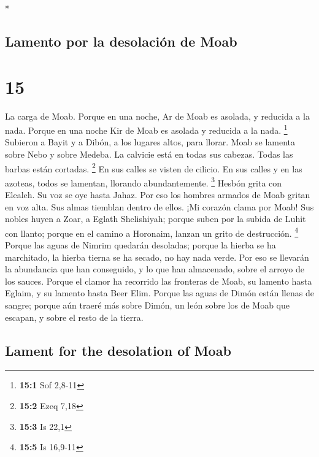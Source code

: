 \begin{paracol}{2}
\begin{otherlanguage}{english}
\end{otherlanguage}

\switchcolumn[0]*

\hypertarget{lamento-por-la-desolaciuxf3n-de-moab}{%
\subsection{Lamento por la desolación de
Moab}\label{lamento-por-la-desolaciuxf3n-de-moab}}

\hypertarget{section-28}{%
\section{15}\label{section-28}}

 La carga de Moab. Porque en una noche, Ar de Moab es
asolada, y reducida a la nada. Porque en una noche Kir de Moab es
asolada y reducida a la nada. \footnote{\textbf{15:1} Sof 2,8-11}
 Subieron a Bayit y a Dibón, a los lugares altos, para
llorar. Moab se lamenta sobre Nebo y sobre Medeba. La calvicie está en
todas sus cabezas. Todas las barbas están cortadas. \footnote{\textbf{15:2}
  Ezeq 7,18}  En sus calles se visten de cilicio. En sus
calles y en las azoteas, todos se lamentan, llorando abundantemente.
\footnote{\textbf{15:3} Is 22,1}  Hesbón grita con
Elealeh. Su voz se oye hasta Jahaz. Por eso los hombres armados de Moab
gritan en voz alta. Sus almas tiemblan dentro de ellos. 
¡Mi corazón clama por Moab! Sus nobles huyen a Zoar, a Eglath
Shelishiyah; porque suben por la subida de Luhit con llanto; porque en
el camino a Horonaim, lanzan un grito de destrucción. \footnote{\textbf{15:5}
  Is 16,9-11}  Porque las aguas de Nimrim quedarán
desoladas; porque la hierba se ha marchitado, la hierba tierna se ha
secado, no hay nada verde.  Por eso se llevarán la
abundancia que han conseguido, y lo que han almacenado, sobre el arroyo
de los sauces.  Porque el clamor ha recorrido las
fronteras de Moab, su lamento hasta Eglaim, y su lamento hasta Beer
Elim.  Porque las aguas de Dimón están llenas de sangre;
porque aún traeré más sobre Dimón, un león sobre los de Moab que
escapan, y sobre el resto de la tierra.

\switchcolumn
\begin{otherlanguage}{english}

\hypertarget{lament-for-the-desolation-of-moab}{%
\subsection{Lament for the desolation of
Moab}\label{lament-for-the-desolation-of-moab}}


\end{otherlanguage}
\end{paracol}
